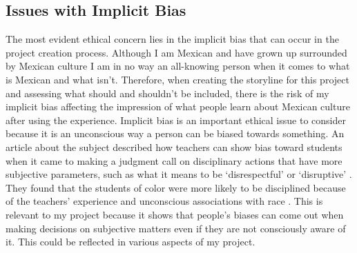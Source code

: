 \documentclass[10pt,twocolumn]{article}
\begin{document}
\subsection{Issues with Implicit Bias}
The most evident ethical concern lies in the implicit bias that can occur in the project creation process. Although I am Mexican and have grown up surrounded by Mexican culture I am in no way an all-knowing person when it comes to what is Mexican and what isn’t. Therefore, when creating the storyline for this project and assessing what should and shouldn’t be included, there is the risk of my implicit bias affecting the impression of what people learn about Mexican culture after using the experience. Implicit bias is an important ethical issue to consider because it is an unconscious way a person can be biased towards something. An article about the subject described how teachers can show bias toward students when it came to making a judgment call on disciplinary actions that have more subjective parameters, such as what it means to be ‘disrespectful’ or ‘disruptive’ \cite{implicitbias201516}. They found that the students of color were more likely to be disciplined because of the teachers’ experience and unconscious associations with race \cite{implicitbias201516}. This is relevant to my project because it shows that people's biases can come out when making decisions on subjective matters even if they are not consciously aware of it. This could be reflected in various aspects of my project. 


\printbibliography 
\end{document}

